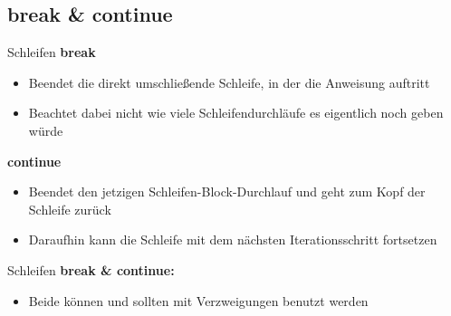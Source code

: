 \subsection{break \& continue}
\begin{frame}{Schleifen}
	\textbf{break}\\
	\begin{itemize}
		\item Beendet die direkt umschließende Schleife, in der die Anweisung auftritt
		\item Beachtet dabei nicht wie viele Schleifendurchläufe es eigentlich noch geben würde
	\end{itemize}
	\textbf{continue}\\
	\begin{itemize}
		\item Beendet den jetzigen Schleifen-Block-Durchlauf und geht zum Kopf der Schleife zurück
		\item Daraufhin kann die Schleife mit dem nächsten Iterationsschritt fortsetzen
	\end{itemize}
\end{frame}

\begin{frame}{Schleifen}
	\textbf{break \& continue:}\\
	\begin{itemize}
		\item Beide können und sollten mit Verzweigungen benutzt werden
	\end{itemize}
	
\end{frame}


